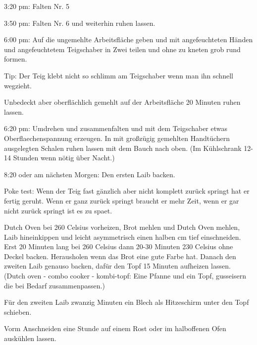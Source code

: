 { 3:20 pm: Falten Nr. 5

 3:50 pm: Falten Nr. 6 und weiterhin ruhen lassen.

 6:00 pm: Auf die ungemehlte Arbeitsfläche geben und mit angefeuchteten Händen und angefeuchtetem Teigschaber in Zwei teilen und ohne zu kneten grob rund formen.

Tip: Der Teig klebt nicht so schlimm am Teigschaber wenn man ihn schnell wegzieht.

Unbedeckt aber oberflächlich gemehlt auf der Arbeitsfläche 20 Minuten ruhen lassen.

 6:20 pm:
Umdrehen und zusammenfalten und mit dem Teigschaber etwas Oberflaechenspannung erzeugen.
In mit großzügig gemehlten Handtüchern ausgelegten Schalen ruhen lassen mit dem Bauch nach oben. (Im Kühlschrank 12-14 Stunden wenn nötig über Nacht.)

 8:20 oder am nächsten Morgen: Den ersten Laib backen.

Poke test: Wenn der Teig fast gänzlich aber nicht komplett zurück springt hat er fertig geruht.
Wenn er ganz zurück springt braucht er mehr Zeit, wenn er gar nicht zurück springt ist es zu spaet.

Dutch Oven bei 260 Celsius vorheizen, Brot mehlen und Dutch Oven mehlen, Laib hineinkippen und leicht asymmetrisch einen halben cm tief einschneiden.
Erst 20 Minuten lang bei 260 Celsius dann 20-30 Minuten 230 Celsius ohne Deckel backen.
Herausholen wenn das Brot eine gute Farbe hat.
Danach den zweiten Laib genauso backen, dafür den Topf 15 Minuten aufheizen lassen.
(Dutch oven - combo cooker - kombi-topf:
Eine Pfanne und ein Topf, gusseisern die bei Bedarf zusammenpassen.)

Für den zweiten Laib zwanzig Minuten ein Blech als Hitzeschirm unter den Topf schieben.

Vorm Anschneiden eine Stunde auf einem Rost oder im halboffenen Ofen auskühlen lassen. }

\newpage
{}

